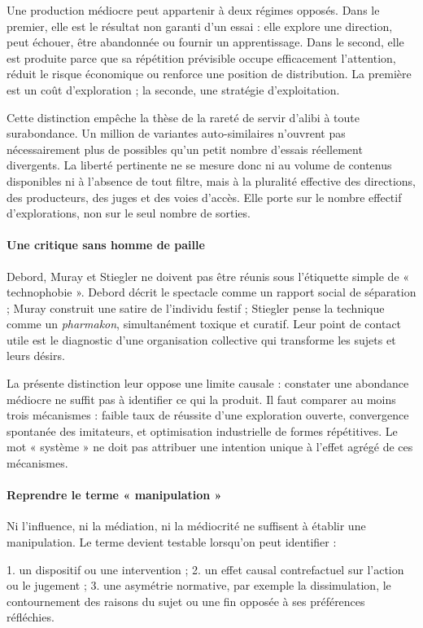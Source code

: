 \documentclass[10pt,a4paper]{article}
\begin{document}
Une production médiocre peut appartenir à deux régimes opposés. Dans le premier, elle est le résultat non garanti d'un essai : elle explore une direction, peut échouer, être abandonnée ou fournir un apprentissage. Dans le second, elle est produite parce que sa répétition prévisible occupe efficacement l'attention, réduit le risque économique ou renforce une position de distribution. La première est un coût d'exploration ; la seconde, une stratégie d'exploitation.

Cette distinction empêche la thèse de la rareté de servir d'alibi à toute surabondance. Un million de variantes auto-similaires n'ouvrent pas nécessairement plus de possibles qu'un petit nombre d'essais réellement divergents. La liberté pertinente ne se mesure donc ni au volume de contenus disponibles ni à l'absence de tout filtre, mais à la pluralité effective des directions, des producteurs, des juges et des voies d'accès. Elle porte sur le nombre effectif d'explorations, non sur le seul nombre de sorties.

\paragraph{Une critique sans homme de paille}
Debord, Muray et Stiegler ne doivent pas être réunis sous l'étiquette simple de « technophobie ». Debord décrit le spectacle comme un rapport social de séparation ; Muray construit une satire de l'individu festif ; Stiegler pense la technique comme un \emph{pharmakon}, simultanément toxique et curatif. Leur point de contact utile est le diagnostic d'une organisation collective qui transforme les sujets et leurs désirs.

La présente distinction leur oppose une limite causale : constater une abondance médiocre ne suffit pas à identifier ce qui la produit. Il faut comparer au moins trois mécanismes : faible taux de réussite d'une exploration ouverte, convergence spontanée des imitateurs, et optimisation industrielle de formes répétitives. Le mot « système » ne doit pas attribuer une intention unique à l'effet agrégé de ces mécanismes.

\paragraph{Reprendre le terme « manipulation »}
Ni l'influence, ni la médiation, ni la médiocrité ne suffisent à établir une manipulation. Le terme devient testable lorsqu'on peut identifier :

1. un dispositif ou une intervention ; 2. un effet causal contrefactuel sur l'action ou le jugement ; 3. une asymétrie normative, par exemple la dissimulation, le contournement des raisons    du sujet ou une fin opposée à ses préférences réfléchies.
\end{document}
